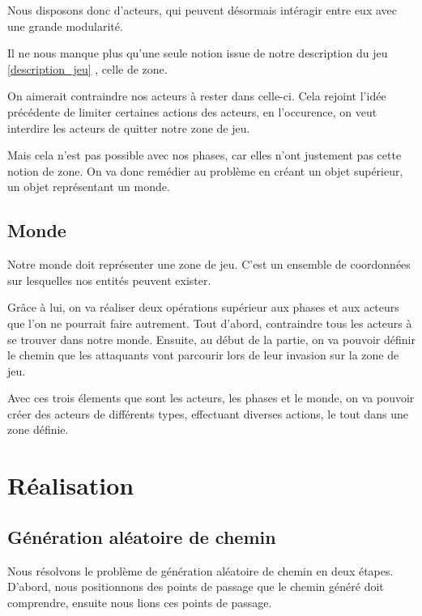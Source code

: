 \documentclass{article}
\begin{document}
Nous disposons donc d'acteurs, qui peuvent désormais intéragir entre eux avec 
une grande modularité.

Il ne nous manque plus qu'une seule notion issue de notre description du jeu 
\ref{description_jeu} , celle de zone.

On aimerait contraindre nos acteurs à rester dans celle-ci. Cela 
rejoint l'idée précédente de limiter certaines actions des acteurs, en l'occurence, 
on veut interdire les acteurs de quitter notre zone de jeu.

Mais cela n'est pas possible avec nos phases, car elles n'ont justement pas 
cette notion de zone.
On va donc remédier au problème en créant un objet supérieur, un objet représentant 
un monde.

\subsection{Monde}

Notre monde doit représenter une zone de jeu.
C'est un ensemble de coordonnées sur lesquelles nos entités peuvent exister.

Grâce à lui, on va réaliser deux opérations supérieur aux phases et aux acteurs que 
l'on ne pourrait faire autrement.
Tout d'abord, contraindre tous les acteurs à se trouver dans notre monde.
Ensuite, au début de la partie, on va pouvoir définir le chemin que 
les attaquants vont parcourir lors de leur invasion sur la zone de jeu.

Avec ces trois élements que sont les acteurs, les phases et le monde, on va pouvoir 
créer des acteurs de différents types, effectuant diverses actions, le tout dans une 
zone définie.


\section{Réalisation}

\subsection{Génération aléatoire de chemin}
Nous résolvons le problème de génération aléatoire de chemin en deux étapes. D'abord, nous positionnons des points de passage que le chemin généré doit comprendre, ensuite nous lions ces points de passage.
\end{document}
